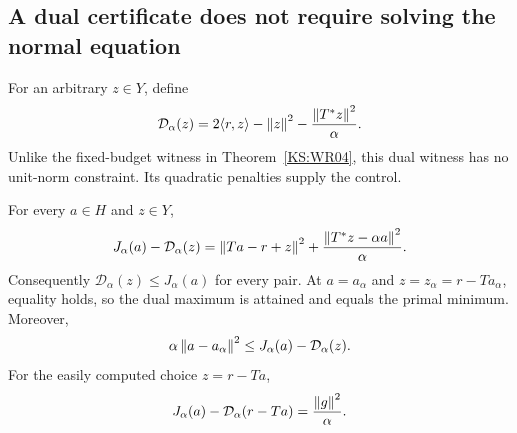 \subsection{A dual certificate does not require solving the normal equation}
For an arbitrary $z\in Y$, define
\[
 \mathcal D_\alpha(z)=2\langle r,z\rangle-\left\lVert z\right\rVert^2
                    -\frac{\left\lVert T^*z\right\rVert^2}{\alpha}.
\]
Unlike the fixed-budget witness in Theorem~\ref{KS:WR04}, this dual witness has no unit-norm constraint. Its quadratic penalties supply the control.

\begin{KStheorem}\label{KS:WR14}
For every $a\in H$ and $z\in Y$,
\begin{equation}\label{KS:eq:regularized-duality-gap}
 J_\alpha(a)-\mathcal D_\alpha(z)
 =\left\lVert Ta-r+z\right\rVert^2+
   \frac{\left\lVert T^*z-\alpha a\right\rVert^2}{\alpha}.
\end{equation}
Consequently $\mathcal D_\alpha(z)\le J_\alpha(a)$ for every pair. At
$a=a_\alpha$ and $z=z_\alpha=r-Ta_\alpha$, equality holds, so the dual maximum is attained and equals the primal minimum. Moreover,
\[
 \alpha\left\lVert a-a_\alpha\right\rVert^2
 \le J_\alpha(a)-\mathcal D_\alpha(z).
\]
For the easily computed choice $z=r-Ta$,
\begin{equation}\label{KS:eq:residual-dual-gap}
 J_\alpha(a)-\mathcal D_\alpha(r-Ta)=\frac{\left\lVert g\right\rVert^2}{\alpha}.
\end{equation}
\end{KStheorem}
